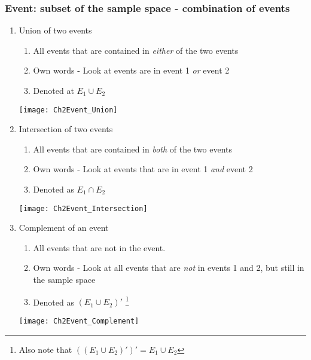 \documentclass[../INDE315.tex]{subfiles}
\begin{document}
\subsubsection*{Event: subset of the sample space - combination of events}
\begin{enumerate}
    \item Union of two events
        \begin{enumerate}
            \item All events that are contained in \emph{either} of the two events
            \item Own words - Look at events are in event 1 \emph{or} event 2
            \item Denoted at $E_1 \cup E_2$
        \end{enumerate}
        \begin{center}
            \texttt{[image: Ch2Event\_Union]} %
        \end{center}
    \item Intersection of two events
        \begin{enumerate}
            \item All events that are contained in \emph{both} of the two events
            \item Own words - Look at events that are in event 1 \emph{and} event 2
            \item Denoted as $E_1 \cap E_2$
        \end{enumerate}
        \begin{center}
            \texttt{[image: Ch2Event\_Intersection]}
        \end{center}
    \item Complement of an event
        \begin{enumerate}
            \item All events that are not in the event.
            \item Own words - Look at all events that are \emph{not} in events 1 and 2, but still in the sample space
            \item Denoted as $(E_1 \cup E_2)'$ \footnote{Also note that $((E_1 \cup E_2)')' = E_1 \cup E_2$}
        \end{enumerate}
        \begin{center}
            \texttt{[image: Ch2Event\_Complement]}

\end{center}
\end{enumerate}
\end{document}
